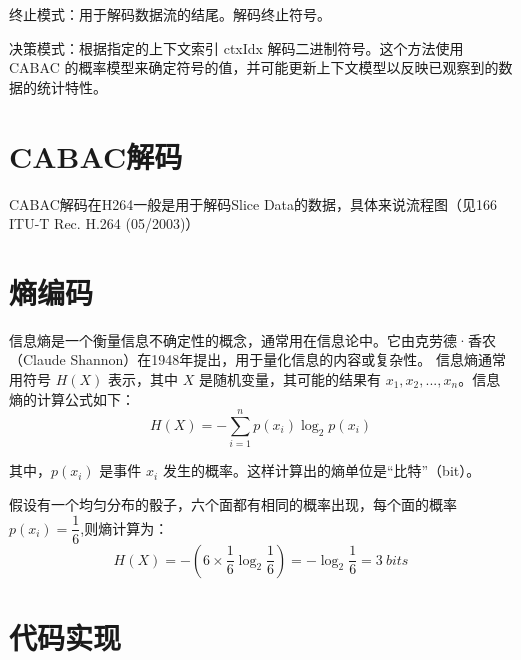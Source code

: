 \documentclass{/Users/hi/Study/template/code}
\begin{document}
终止模式：用于解码数据流的结尾。解码终止符号。

决策模式：根据指定的上下文索引 ctxIdx 解码二进制符号。这个方法使用 CABAC 的概率模型来确定符号的值，并可能更新上下文模型以反映已观察到的数据的统计特性。



\newpage
\section{CABAC解码}
CABAC解码在H264一般是用于解码Slice Data的数据，具体来说流程图（见166 ITU-T Rec. H.264 (05/2003)）


\newpage
\section{熵编码}
\begin{definition}
	信息熵是一个衡量信息不确定性的概念，通常用在信息论中。它由克劳德·香农（Claude Shannon）在1948年提出，用于量化信息的内容或复杂性。
	信息熵通常用符号 \( H(X) \) 表示，其中 \( X \) 是随机变量，其可能的结果有 \( x_1, x_2, ..., x_n \)。信息熵的计算公式如下：
	\begin{equation}
		H( X ) = - \sum_{i=1}^{n} p( x_i  ) \log_2 p( x_i )
	\end{equation}
\end{definition}
其中，\( p(x_i) \) 是事件 \( x_i \) 发生的概率。这样计算出的熵单位是“比特”（bit）。

假设有一个均匀分布的骰子，六个面都有相同的概率出现，每个面的概率 \( p(x_i) = \dfrac{1}{6} \),则熵计算为：
\begin{equation}
	H(X) = -\left(6 \times \frac{1}{6} \log_2 \frac{1}{6}\right) = -\log_2 \frac{1}{6} = 3 ~ bits
\end{equation}

\newpage
\section{代码实现}
\end{document}
